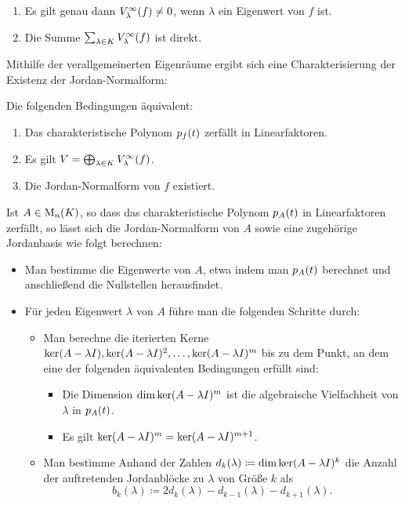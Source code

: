 \begin{lemma}
  \begin{enumerate}
    \item
      Es gilt genau dann $V_{\lambda}^{\infty}(f) \neq 0$, wenn $\lambda$ ein Eigenwert von $f$ ist.
    \item
      Die Summe $\sum_{\lambda \in K} V_{\lambda}^{\infty}(f)$ ist direkt.
  \end{enumerate}
\end{lemma}

Mithilfe der verallgemeinerten Eigenräume ergibt sich eine Charakterisierung der Existenz der Jordan-Normalform:

\begin{theorem}
  \label{theorem: existence of generalized eigespace decomposition and jordan normal form}
  Die folgenden Bedingungen äquivalent:
  \begin{enumerate}
    \item
      Das charakteristische Polynom $p_{f}(t)$ zerfällt in Linearfaktoren.
    \item
      Es gilt $V = \bigoplus_{\lambda \in K} V_{\lambda}^{\infty}(f)$.
    \item
      Die Jordan-Normalform von $f$ existiert.
  \end{enumerate}
\end{theorem}

Ist $A \in \operatorname{M}_{n}(K)$, so dass das charakteristische Polynom $p_{A}(t)$ in Linearfaktoren zerfällt, so lässt sich die Jordan-Normalform von $A$ sowie eine zugehörige Jordanbasis wie folgt berechnen:

\begin{itemize}
  \item
    Man bestimme die Eigenwerte von $A$, etwa indem man $p_{A}(t)$ berechnet und anschließend die Nullstellen herausfindet.
    
  \item
    Für jeden Eigenwert $\lambda$ von $A$ führe man die folgenden Schritte durch:
    \begin{itemize}
      \item
        Man berechne die iterierten Kerne $\ker (A - \lambda I), \ker (A - \lambda I)^2, \dotsc, \ker (A - \lambda I)^m$ bis zu dem Punkt, an dem eine der folgenden äquivalenten Bedingungen erfüllt sind:
        \begin{itemize}
          \item
            Die Dimension $\dim \ker (A - \lambda I)^m$ ist die algebraische Vielfachheit von $\lambda$ in $p_{A}(t)$.
          \item
            Es gilt $\ker (A - \lambda I)^m = \ker (A - \lambda I)^{m+1}$.
        \end{itemize}
      \item
        Man bestimme Anhand der Zahlen $d_k(\lambda) \coloneqq \dim \ker (A - \lambda I)^k$ die Anzahl der auftretenden Jordanblöcke zu $\lambda$ von Größe $k$ als
        \[
          b_k(\lambda) \coloneqq 2 d_k(\lambda) - d_{k-1}(\lambda) - d_{k+1}(\lambda).
        \]
    \end{itemize}
\end{itemize}

